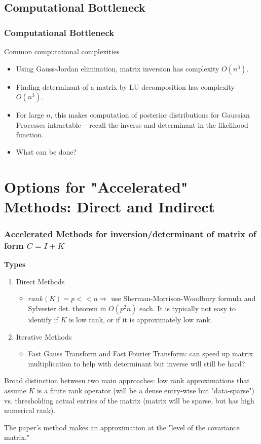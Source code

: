 \documentclass{beamer}
\begin{document}
\subsection{Computational Bottleneck} 
\begin{frame}
\frametitle{Computational Bottleneck}
\begin{block}{Common computational complexities}
\begin{itemize}
\item Using Gauss-Jordan elimination, matrix inversion has complexity $O(n^3)$.
\item Finding determinant of a matrix by LU decomposition has complexity $O(n^3)$.
\end{itemize}
\end{block}
\begin{itemize}
\item For large $n$, this makes computation of posterior distributions for Gaussian Processes intractable -- recall the inverse and determinant in the likelihood function.
\item What can be done?
\end{itemize}

\end{frame}

\section{Options for "Accelerated" Methods: Direct and Indirect}
\begin{frame}
\frametitle{Accelerated Methods for inversion/determinant of matrix of form $C=I+K$}

\textbf{Types}

\begin{enumerate}
\item Direct Methods
	\begin{itemize}
		\item $rank(K) = p <<n \Rightarrow$ use Sherman-Morrison-Woodbury 		formula and Sylvester det. theorem in $O(p^2 n)$ each. It is typically not 		easy to identify if $K$ is low rank, or if it is approximately low rank.
	\end{itemize}
\item Iterative Methods
	\begin{itemize}
		\item Fast Gauss Transform and Fast Fourier Transform: can speed up matrix multiplication to help with determinant but inverse will still be hard?
	\end{itemize}
\end{enumerate}

Broad distinction between two main approaches: low rank approximations that assume $K$ is a finite rank operator (will be a dense entry-wise but "data-sparse") vs. thresholding actual entries of the matrix (matrix will be sparse, but has high numerical rank).

The paper's method makes an approximation at the "level of the covariance matrix."
\end{frame}
\end{document}
